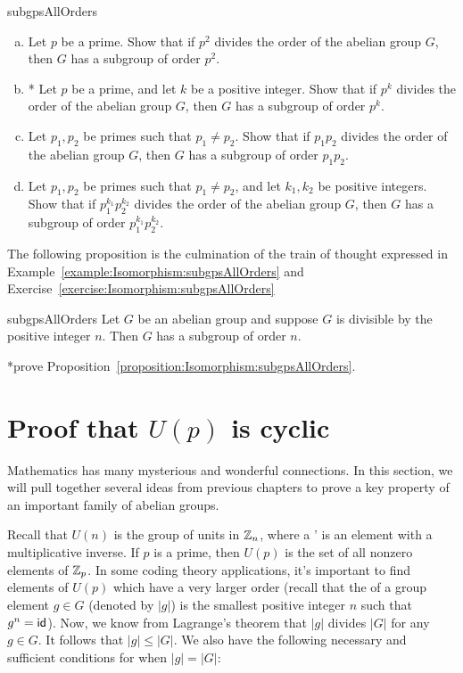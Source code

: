 \begin{exercise}{subgpsAllOrders}
\begin{enumerate}[(a)]
\item
Let $p$ be a prime. Show that if $p^2$ divides the order of the abelian group $G$, then $G$ has a subgroup of order $p^2$.
\item
* Let $p$ be a prime, and let $k$ be a positive integer. Show that if $p^k$ divides the order of the abelian group $G$, then $G$ has a subgroup of order $p^k$.
\item
Let $p_1, p_2$ be primes such that $p_1 \neq p_2$.  Show that if $p_1p_2$ divides the order of the abelian group $G$, then $G$ has a subgroup of order $p_1p_2$.
\item
Let $p_1, p_2$ be primes such that $p_1 \neq p_2$, and let $k_1,k_2$ be positive integers.  Show that if $p_1^{k_1}p_2^{k_2}$ divides the order of the abelian group $G$, then $G$ has a subgroup of order $p_1^{k_1}p_2^{k_2}$.
\end{enumerate}
\end{exercise}

The following proposition is the culmination of the train of thought expressed in Example~\ref{example:Isomorphism:subgpsAllOrders} and Exercise~\ref{exercise:Isomorphism:subgpsAllOrders}

\begin{prop}{subgpsAllOrders} Let $G$ be an abelian group and suppose $G$ is divisible by the positive integer $n$.  Then $G$ has a subgroup of order $n$.
\end{prop}

\begin{exercise} *prove Proposition~\ref{proposition:Isomorphism:subgpsAllOrders}.
\end{exercise} 


 
\section{Proof that $U(p)$ is cyclic}
\label{sec:Isomorphism:UpIsCyclic}

Mathematics has many mysterious and wonderful connections. In this section, we will pull together several ideas from previous chapters to prove a key property of an important family of abelian groups.
 
Recall that $U(n)$ is the group of units in $\mathbb{Z}_n$, where a ' is an element with a multiplicative inverse. If $p$ is a prime, then $U(p)$ is the set of all nonzero elements of $\mathbb{Z}_p$. In some coding theory applications, it's important to find elements of $U(p)$ which have a very larger order (recall that the  of a group element $g \in G$ (denoted by $|g|$)  is the smallest positive integer $n$ such that $g^n = {\sf{i}d}$). Now, we know from Lagrange's theorem that $|g|$ divides $|G|$ for any $g \in G$.  It follows that $|g| \le |G|$. We also have the following necessary and sufficient conditions for when $|g|=|G|$:

